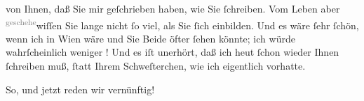                von Ihnen, daß Sie mir geſchrieben haben, wie Sie ſchreiben. Vom Leben aber {\pb}\substVorne{}\textsuperscript{\textcolor{gray}{geschehe}}\substDazwischen{}wiſſen\substHinten{} Sie lange nicht ſo viel, als Sie ſich einbilden. Und es wäre ſehr ſchön,
               wenn ich in Wien wäre und Sie Beide öfter ſehen könnte; ich würde
               wahrſcheinlich weniger \label{K_L03525-4v}\label{K_L03525-4}! Und es iſt unerhört, daß ich heut ſchon
               wieder Ihnen ſchreiben muß, ſtatt Ihrem Schweſterchen, wie ich eigentlich vorhatte.\pend
           
\pstart
           So, und jetzt reden wir vernünftig!\pend
           
